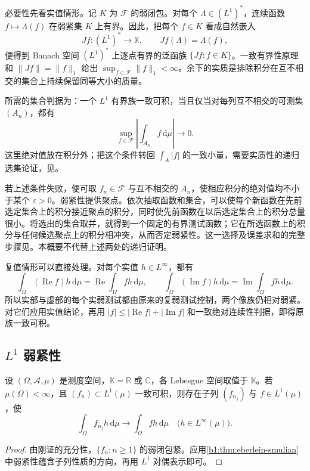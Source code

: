\begin{proofsketch}
必要性先看实值情形。记 \(K\) 为 \(\mathcal F\) 的弱闭包。对每个 \(\Lambda\in(L^1)^*\)，连续函数 \(f\mapsto\Lambda(f)\) 在弱紧集 \(K\) 上有界。因此，把每个 \(f\in K\) 看成自然嵌入
\[
 Jf:(L^1)^*\longrightarrow\mathbb K,
 \qquad Jf(\Lambda)=\Lambda(f),
\]
便得到 Banach 空间 \((L^1)^*\) 上逐点有界的泛函族 \(\{Jf:f\in K\}\)。一致有界性原理和 \(\|Jf\|=\|f\|_1\) 给出 \(\sup_{f\in\mathcal F}\|f\|_1<\infty\)。余下的实质是排除积分在互不相交的集合上持续保留同等大小的质量。

所需的集合判据为：一个 \(L^1\) 有界族一致可积，当且仅当对每列互不相交的可测集 \((A_n)\)，都有
\[
  \sup_{f\in\mathcal F}\left|\int_{A_n}f\,\mathrm d\mu\right|
  \longrightarrow0.
\]
这里绝对值放在积分外；把这个条件转回 \(\int_A|f|\) 的一致小量，需要实质性的递归选集论证，见\cite[Volume 2, 246G(iii)]{Fremlin2016Measure}。

若上述条件失败，便可取 \(f_n\in\mathcal F\) 与互不相交的 \(A_n\)，使相应积分的绝对值均不小于某个 \(\varepsilon>0\)。弱紧性提供聚点。依次抽取函数和集合，可以使每个新函数在先前选定集合上的积分接近聚点的积分，同时使先前函数在以后选定集合上的积分总量很小。将选出的集合取并，就得到一个固定的有界测试函数；它在所选函数上的积分与任何候选聚点上的积分相冲突，从而否定弱紧性。这一选择及误差求和的完整步骤见\cite[Volume 2, 247C(a)]{Fremlin2016Measure}。本概要不代替上述两处的递归证明。

复值情形可以直接处理。对每个实值 \(h\in L^\infty\)，都有
\[
 \int_\Omega(\operatorname{Re}f)h\,\mathrm d\mu
 =\operatorname{Re}\int_\Omega fh\,\mathrm d\mu,
 \qquad
 \int_\Omega(\operatorname{Im}f)h\,\mathrm d\mu
 =\operatorname{Im}\int_\Omega fh\,\mathrm d\mu.
\]
所以实部与虚部的每个实弱测试都由原来的复弱测试控制，两个像族仍相对弱紧。对它们应用实值结论，再用 \(|f|\leq|\operatorname{Re}f|+|\operatorname{Im}f|\) 和一致绝对连续性判据，即得原族一致可积。
\end{proofsketch}

\subsection{\texorpdfstring{\(L^1\)}{L1} 弱紧性}
\label{b1:subsec:100503}

\begin{corollary}[一致可积列的弱收敛子列]
\label{b1:cor:l1-ui-weak-subsequence}
设 \((\Omega,\mathcal A,\mu)\) 是测度空间，\(\mathbb K=\mathbb R\) 或 \(\mathbb C\)，各 Lebesgue 空间取值于 \(\mathbb K\)。若 \(\mu(\Omega)<\infty\)，且 \((f_n)\subset L^1(\mu)\) 一致可积，则存在子列 \((f_{n_j})\) 与 \(f\in L^1(\mu)\)，使
\[
  \int_\Omega f_{n_j}h\,\mathrm d\mu
  \longrightarrow\int_\Omega fh\,\mathrm d\mu
  \quad\bigl(h\in L^\infty(\mu)\bigr).
\]
\end{corollary}
\begin{proof}
由刚证的充分性，\(\{f_n:n\geq1\}\) 的弱闭包紧。应用\cref{b1:thm:eberlein-smulian}中弱紧性蕴含子列性质的方向，再用 \(L^1\) 对偶表示即可。
\end{proof}

